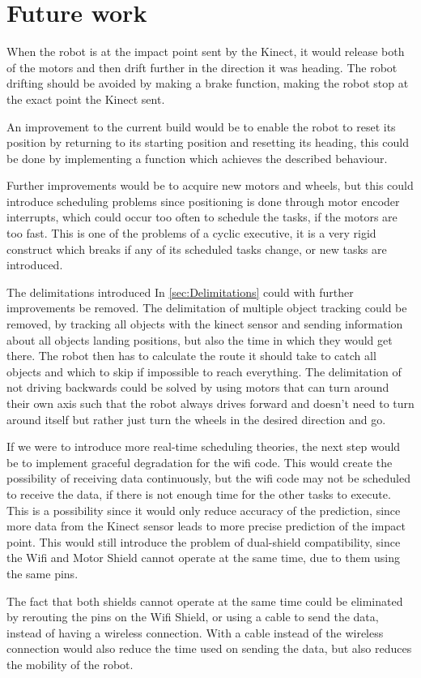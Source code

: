 \chapter{Future work}
\label{chap:FutureWork}
When the robot is at the impact point sent by the Kinect, it would release both of the motors and then drift further in the direction it was heading. The robot drifting should be avoided by making a brake function, making the robot stop at the exact point the Kinect sent.

An improvement to the current build would be to enable the robot to reset its position by returning to its starting position and resetting its heading, this could be done by implementing a function which achieves the described behaviour.

Further improvements would be to acquire new motors and wheels, but this could introduce scheduling problems since positioning is done through motor encoder interrupts, which could occur too often to schedule the tasks, if the motors are too fast.
This is one of the problems of a cyclic executive, it is a very rigid construct which breaks if any of its scheduled tasks change, or new tasks are introduced.

The delimitations introduced In \ref{sec:Delimitations} could with further improvements be removed. The delimitation of multiple object tracking could be removed, by tracking all objects with the kinect sensor and sending information about all objects landing positions, but also the time in which they would get there. The robot then has to calculate the route it should take to catch all objects and which to skip if impossible to reach everything. The delimitation of not driving backwards could be solved by using motors that can turn around their own axis such that the robot always drives forward and doesn’t need to turn around itself but rather just turn the wheels in the desired direction and go.

If we were to introduce more real-time scheduling theories, the next step would be to implement graceful degradation for the wifi code. This would create the possibility of receiving data continuously, but the wifi code may not be scheduled to receive the data, if there is not enough time for the other tasks to execute. This is a possibility since it would only reduce accuracy of the prediction, since more data from the Kinect sensor leads to more precise prediction of the impact point. This would still introduce the problem of dual-shield compatibility, since the Wifi and Motor Shield cannot operate at the same time, due to them using the same pins.

The fact that both shields cannot operate at the same time could be eliminated by rerouting the pins on the Wifi Shield, or using a cable to send the data, instead of having a wireless connection. With a cable instead of the wireless connection would also reduce the time used on sending the data, but also reduces the mobility of the robot.
